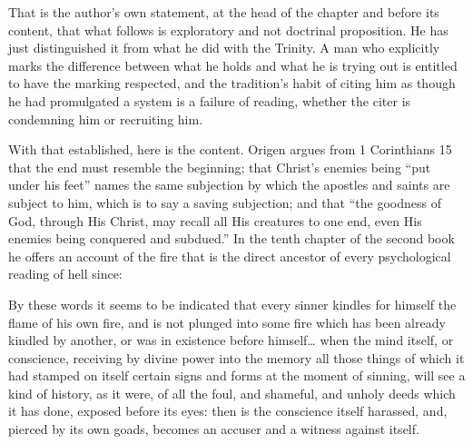 That is the author's own statement, at the head of the chapter and before its content, that what follows is exploratory and not doctrinal proposition. He has just distinguished it from what he did with the Trinity. A man who explicitly marks the difference between what he holds and what he is trying out is entitled to have the marking respected, and the tradition's habit of citing him as though he had promulgated a system is a failure of reading, whether the citer is condemning him or recruiting him.

With that established, here is the content. Origen argues from 1 Corinthians 15 that the end must resemble the beginning; that Christ's enemies being ``put under his feet'' names the same subjection by which the apostles and saints are subject to him, which is to say a saving subjection; and that ``the goodness of God, through His Christ, may recall all His creatures to one end, even His enemies being conquered and subdued.'' In the tenth chapter of the second book he offers an account of the fire that is the direct ancestor of every psychological reading of hell since:

\begin{studyframe}
By these words it seems to be indicated that every sinner kindles for himself the flame of his own fire, and is not plunged into some fire which has been already kindled by another, or was in existence before himself\ldots{} when the mind itself, or conscience, receiving by divine power into the memory all those things of which it had stamped on itself certain signs and forms at the moment of sinning, will see a kind of history, as it were, of all the foul, and shameful, and unholy deeds which it has done, exposed before its eyes: then is the conscience itself harassed, and, pierced by its own goads, becomes an accuser and a witness against itself.
\end{studyframe}

